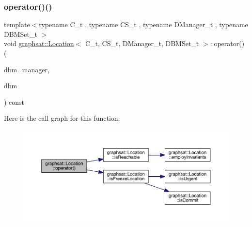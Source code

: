 \subsubsection{\texorpdfstring{operator()()}{operator()()}\hspace{0.1cm}{\footnotesize\ttfamily [1/2]}}
{\footnotesize\ttfamily template$<$typename C\+\_\+t , typename C\+S\+\_\+t , typename D\+Manager\+\_\+t , typename D\+B\+M\+Set\+\_\+t $>$ \\
void \mbox{\hyperlink{classgraphsat_1_1_location}{graphsat\+::\+Location}}$<$ C\+\_\+t, C\+S\+\_\+t, D\+Manager\+\_\+t, D\+B\+M\+Set\+\_\+t $>$\+::operator() (\begin{DoxyParamCaption}\item[{const D\+Manager\+\_\+t \&}]{dbm\+\_\+manager,  }\item[{C\+\_\+t $\ast$}]{dbm }\end{DoxyParamCaption}) const\hspace{0.3cm}{\ttfamily [inline]}}

Here is the call graph for this function\+:
\nopagebreak
\begin{figure}[H]
\begin{center}
\leavevmode
\includegraphics[width=350pt]{classgraphsat_1_1_location_acff10a7428288b8377a65c3377949160_cgraph}
\end{center}
\end{figure}
\mbox{\label{classgraphsat_1_1_location_af10b55e77e449360de6b5ad8b1b30e44}} 
